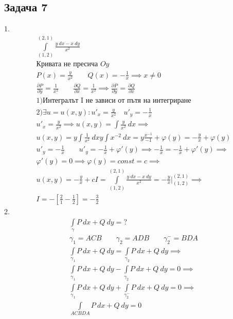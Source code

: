 \documentclass[a4paper,fleqn,12pt]{article}
\theoremstyle{definition}
\begin{document}
\subsection*{Задача 7}
1.\\
\begin{gather*}
\int\limits_{(1,2)} ^{(2,1)} \frac{y \ dx - x \ dy}{x^2}\\
\text{Кривата не пресича $Oy$}\\
P(x) = \frac{y}{x^2} \qquad Q(x) = - \frac{1}{x} \implies x \neq 0 \\
\frac{\partial P}{\partial y} = \frac{1}{x^2} \qquad \frac{\partial Q}{\partial x} = \frac{1}{x^2} \implies \frac{\partial P}{\partial y} = \frac{\partial Q}{\partial x} \\
1) \text{Интегралът I не зависи от пътя на интегриране} \\
2) \exists u = u(x,y) : u'_x = \frac{y}{x^2} \quad u'_y = - \frac{1}{x}\\
u'_x = \frac{y}{x^2} \implies u(x,y) = \int \frac{y}{x^2} \ dx \implies \\
u(x,y) =  y \int \frac{1}{x^2} \ dx  y \int x^{-2} \ dx = y\frac{x^{-1}}{-1} + \varphi(y) = -\frac{y}{x}+ \varphi(y) \\
u'_y = - \frac{1}{x} \qquad u'_y = - \frac{1}{x} + \varphi'(y) \implies - \frac{1}{x} = - \frac{1}{x} + \varphi'(y) \implies \\
\varphi'(y) = 0 \implies \varphi(y) = const = c \implies \\
u(x,y) = - \frac{y}{x} + c 
I = \int\limits_{(1,2)} ^{(2,1)} \frac{y \ dx - x \ dy}{x^2} = -\frac{y}{x} \Big|_{(1,2)} ^{(2,1)} \implies \\
I = - \left[\frac{2}{1} - \frac{1}{2}\right] = - \frac{3}{2}
\end{gather*}
2. \\
\begin{gather*}
\int\limits_{\gamma} P \ dx + Q \ dy = ? \\
\gamma_1 = ACB \qquad \gamma_2 = ADB \qquad \gamma^- _2 = BDA \\
\int\limits_{\gamma_1} P \ dx + Q \ dy = \int\limits_{\gamma_2} P \ dx + Q \ dy \implies \\
\int\limits_{\gamma_1} P \ dx + Q \ dy - \int\limits_{\gamma_2} P \ dx + Q \ dy = 0 \implies \\ 
\int\limits_{\gamma_1} P \ dx + Q \ dy + \int\limits_{\gamma^- _2} P \ dx + Q \ dy = 0 \implies \\
\int\limits_{ACBDA} P \ dx + Q \ dy = 0 
\end{gather*}
\end{document}
